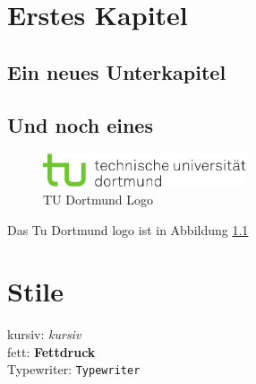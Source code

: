 
\chapter{Erstes Kapitel}
\blindtext

\section{Ein neues Unterkapitel}
\blindtext[5]

\section{Und noch eines}
\blindtext[2]

\begin{figure}
\includegraphics[width=6cm]{img/tud.pdf}
\caption{TU Dortmund Logo \label{fig:logo}}
\end{figure}

Das Tu Dortmund logo ist in Abbildung \ref{fig:logo}

\chapter{Stile}
kursiv: \textit{kursiv}\\  
fett: \textbf{Fettdruck}\\  
Typewriter: \texttt{Typewriter}  



